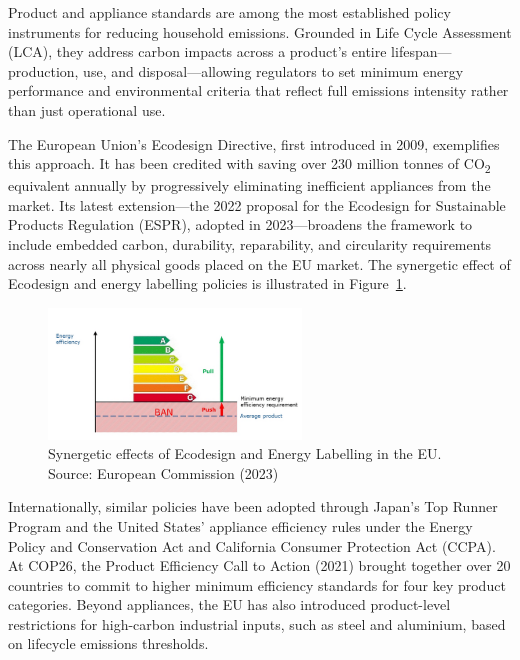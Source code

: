 \documentclass[12pt,a4paper]{article}%
\begin{document}
Product and appliance standards are among the most established policy instruments for reducing household emissions. Grounded in Life Cycle Assessment (LCA), they address carbon impacts across a product’s entire lifespan—production, use, and disposal—allowing regulators to set minimum energy performance and environmental criteria that reflect full emissions intensity rather than just operational use.

The European Union’s Ecodesign Directive, first introduced in 2009, exemplifies this approach. It has been credited with saving over 230 million tonnes of CO\textsubscript{2} equivalent annually by progressively eliminating inefficient appliances from the market. Its latest extension—the 2022 proposal for the Ecodesign for Sustainable Products Regulation (ESPR), adopted in 2023—broadens the framework to include embedded carbon, durability, reparability, and circularity requirements across nearly all physical goods placed on the EU market. The synergetic effect of Ecodesign and energy labelling policies is illustrated in Figure~\ref{fig:ecodesign}.

\begin{figure}[htbp]
  \centering
  \includegraphics[width=0.6\textwidth]{ecodesign.png}
  \caption{\small{Synergetic effects of Ecodesign and Energy Labelling in the EU. Source: European Commission (2023)}}\label{fig:ecodesign}
\end{figure}

Internationally, similar policies have been adopted through Japan’s Top Runner Program and the United States’ appliance efficiency rules under the Energy Policy and Conservation Act and California Consumer Protection Act (CCPA). At COP26, the Product Efficiency Call to Action (2021) brought together over 20 countries to commit to higher minimum efficiency standards for four key product categories. Beyond appliances, the EU has also introduced product-level restrictions for high-carbon industrial inputs, such as steel and aluminium, based on lifecycle emissions thresholds.
\end{document}

